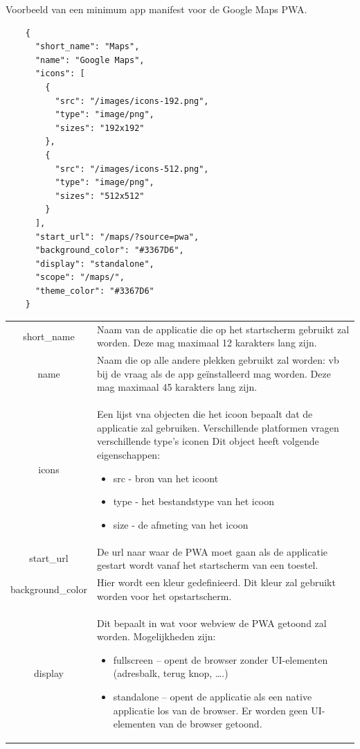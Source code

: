 	Voorbeeld van een minimum app manifest voor de Google Maps PWA.
	
	\begin{lstlisting}
	{
	  "short_name": "Maps",
	  "name": "Google Maps",
	  "icons": [
	    {
	      "src": "/images/icons-192.png",
	      "type": "image/png",
	      "sizes": "192x192"
	    },
	    {
	      "src": "/images/icons-512.png",
	      "type": "image/png",
	      "sizes": "512x512"
	    }
	  ],
	  "start_url": "/maps/?source=pwa",
	  "background_color": "#3367D6",
	  "display": "standalone",
	  "scope": "/maps/",
	  "theme_color": "#3367D6"
	}
	\end{lstlisting}
	
	
		\begin{table}[H]
			\centering
			\begin{tabular}{cp{12cm}}
	     		short\_name & Naam van de applicatie die op het startscherm gebruikt zal worden. Deze mag maximaal 12 karakters lang zijn. \\
	     		name & Naam die op alle andere plekken gebruikt zal worden: vb bij de vraag als de app geïnstalleerd mag worden. Deze mag maximaal 45 karakters lang zijn. \\
	     		icons & Een lijst vna objecten die het icoon bepaalt dat de applicatie zal gebruiken.
Verschillende platformen vragen verschillende type's iconen Dit object heeft volgende eigenschappen:
		     		\begin{itemize}
			    		  \item src - bron van het icoont
			    		  \item type - het bestandstype van het icoon
			    		  \item size - de afmeting van het icoon
	     			\end{itemize} \\
	     		start\_url & De url naar waar de PWA moet gaan als de applicatie gestart wordt vanaf het startscherm van een toestel.\\
	     		background\_color & Hier wordt een kleur gedefinieerd. Dit kleur zal gebruikt worden voor het opstartscherm. \\
	     		display & Dit bepaalt in wat voor webview de PWA getoond zal worden. Mogelijkheden zijn:
		     		\begin{itemize}
			     		  \item fullscreen – opent de browser zonder UI-elementen (adresbalk, terug knop, ….)
			     		  \item standalone – opent de applicatie als een native applicatie los van de browser. Er worden geen UI-elementen van de browser getoond.

\end{itemize}
\end{tabular}
\end{table}
